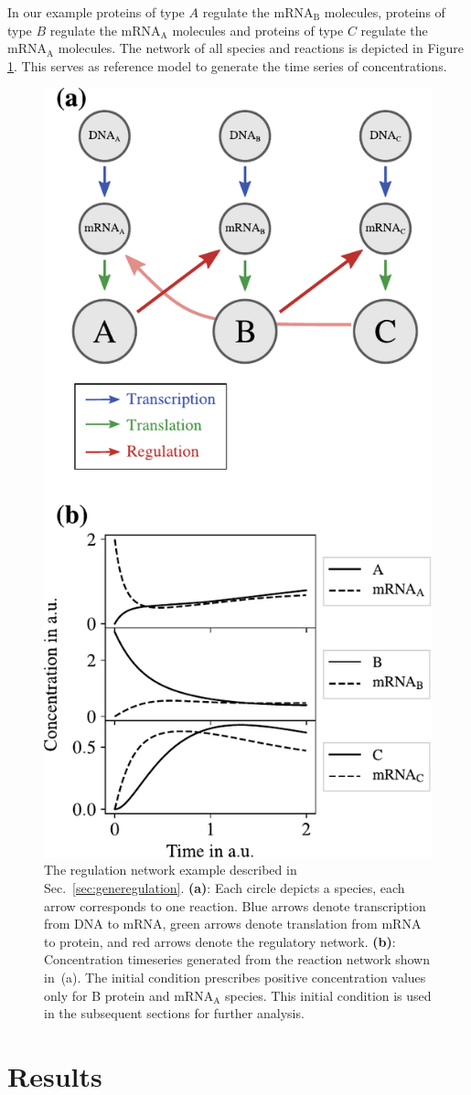 \documentclass[oneside, abstracton, titlepage]{scrartcl}
\begin{document}
    In our example proteins of type $A$ regulate the mRNA$_\mathrm{B}$ molecules, proteins of type $B$ regulate the mRNA$_\mathrm{A}$ molecules and proteins of type $C$ regulate the mRNA$_\mathrm{A}$ molecules. The network of all species and reactions is depicted in Figure \ref{fig:network}. This serves as reference model to generate the time series of concentrations.
    \begin{figure}
        \centering
        \includegraphics[width=.5\textwidth]{./figures_tex/scheme.pdf}
        \caption{The regulation network example described in Sec.~\ref{sec:generegulation}. \textbf{(a)}: Each circle depicts a species, each arrow corresponds to one reaction. Blue arrows denote transcription from DNA to mRNA, green arrows denote translation from mRNA to protein, and red arrows denote the regulatory network. \textbf{(b)}: Concentration timeseries generated from the reaction network shown in~(a). The initial condition prescribes positive concentration values only for B protein and $\mathrm{mRNA}_\mathrm{A}$ species. This initial condition is used in the subsequent sections for further analysis.}
        \label{fig:network}
    \end{figure}

	\section{Results}\label{sec:results}
	
\end{document}
